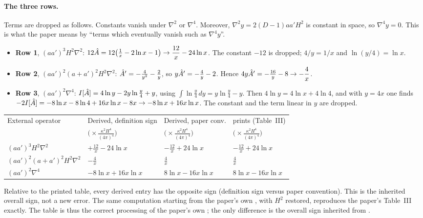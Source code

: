 \paragraph{The three rows.}
Terms are dropped as follows. Constants vanish under $\nabla^2$ or $\nabla^4$.
Moreover, $\nabla^2y=2(D-1)aa'H^2$ is constant in space, so $\nabla^4y=0$. This is what the paper means by ``terms which eventually vanish such as $\nabla^4y$''.
\begin{itemize}[leftmargin=14pt]
\item \textbf{Row 1}, $(aa')^3H^2\nabla^2$: $12\hat A=12\big(\tfrac1x-2\ln x-1\big)\to\dfrac{12}{x}-24\ln x$. The constant $-12$ is dropped; $4/y=1/x$ and $\ln(y/4)=\ln x$.
\item \textbf{Row 2}, $(aa')^2(a+a')^2H^2\nabla^2$: $\hat A'=-\tfrac4{y^2}-\tfrac2y$, so $y\hat A'=-\tfrac4y-2$.
Hence $4y\hat A'=-\tfrac{16}{y}-8\to-\dfrac4x$.
\item \textbf{Row 3}, $(aa')^2\nabla^4$: $I[\hat A]=4\ln y-2y\ln\tfrac y4+y$, using $\int\ln\tfrac y4\,dy=y\ln\tfrac y4-y$.
Then $4\ln y=4\ln x+4\ln4$, and with $y=4x$ one finds $-2I[\hat A]=-8\ln x-8\ln4+16x\ln x-8x\to-8\ln x+16x\ln x$. The constant and the term linear in $y$ are dropped.
\end{itemize}

\begin{center}
\small
\begin{tabular}{@{}llll@{}}
\toprule
External operator & Derived, definition sign & Derived, paper conv. & \PI{} prints (Table~III)\\
& $\big(\times\frac{\kappa^2H^4}{(4\pi)^4}\big)$ & $\big(\times\frac{\kappa^2H^4}{(4\pi)^4}\big)$ & $\big(\times\frac{\kappa^2H^4}{(4\pi)^4}\big)$\\
\midrule
$(aa')^3H^2\nabla^2$ & $+\frac{12}{x}-24\ln x$ & $-\frac{12}{x}+24\ln x$ & $-\frac{12}{x}+24\ln x$\\[2pt]
$(aa')^2(a+a')^2H^2\nabla^2$ & $-\frac4x$ & $\frac4x$ & $\frac4x$\\[2pt]
$(aa')^2\nabla^4$ & $-8\ln x+16x\ln x$ & $8\ln x-16x\ln x$ & $8\ln x-16x\ln x$\\
\bottomrule
\end{tabular}
\end{center}
Relative to the printed table, every derived entry has the opposite sign (definition sign versus paper convention). This is the inherited overall sign, not a new error.
The same computation starting from the paper's own , with $H^2$ restored, reproduces the paper's Table~III exactly.
The table is thus the correct processing of the paper's own ; the only difference is the overall sign inherited from .

